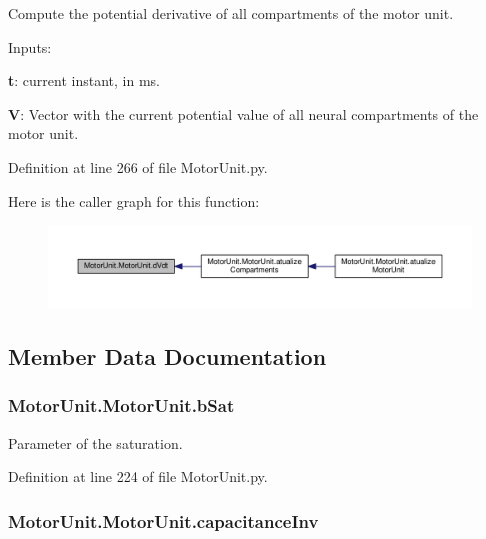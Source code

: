 Compute the potential derivative of all compartments of the motor unit. 


\begin{DoxyItemize}
\item Inputs\-:
\begin{DoxyItemize}
\item {\bfseries t}\-: current instant, in ms.
\item {\bfseries V}\-: Vector with the current potential value of all neural compartments of the motor unit. 
\end{DoxyItemize}
\end{DoxyItemize}

Definition at line 266 of file Motor\-Unit.\-py.



Here is the caller graph for this function\-:
\nopagebreak
\begin{figure}[H]
\begin{center}
\leavevmode
\includegraphics[width=350pt]{class_motor_unit_1_1_motor_unit_af694436ac5bd3194cfcbe42b8a60180d_icgraph}
\end{center}
\end{figure}




\subsection{Member Data Documentation}
\hypertarget{class_motor_unit_1_1_motor_unit_a2256c241b36e0181e3530e6f791545a0}{
\subsubsection[{b\-Sat}]{\setlength{\rightskip}{0pt plus 5cm}Motor\-Unit.\-Motor\-Unit.\-b\-Sat}}\label{class_motor_unit_1_1_motor_unit_a2256c241b36e0181e3530e6f791545a0}


Parameter of the saturation. 



Definition at line 224 of file Motor\-Unit.\-py.

\hypertarget{class_motor_unit_1_1_motor_unit_a0cf2afb5bd12374db56b9d9a5a1671e6}{
\subsubsection[{capacitance\-Inv}]{\setlength{\rightskip}{0pt plus 5cm}Motor\-Unit.\-Motor\-Unit.\-capacitance\-Inv}}\label{class_motor_unit_1_1_motor_unit_a0cf2afb5bd12374db56b9d9a5a1671e6}


